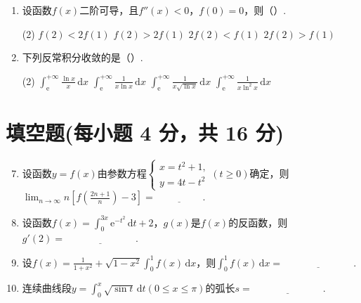 \documentclass[../main.tex]{subfiles}
\begin{document}
\begin{enumerate}
    \item 设函数$f(x)$二阶可导，且$f''(x)<0$，$f(0)=0$，则（\qquad）.

          \begin{tasks}[label=\textbf{\Alph*.}, label-width=1.5em, column-sep=1em](2)
              \task $f(2)<2f(1)$
              \task $f(2)>2f(1)$
              \task $2f(2)<f(1)$
              \task $2f(2)>f(1)$
          \end{tasks}

    \item 下列反常积分收敛的是（\qquad）.

          \begin{tasks}[label=\textbf{\Alph*.}, label-width=1.5em, column-sep=1em](2)
              \task $\int_{\mathrm{e}}^{+\infty}\frac{\ln x}{x}\,\mathrm{d}x$
              \task $\int_{\mathrm{e}}^{+\infty}\frac{1}{x\ln x}\,\mathrm{d}x$
              \task $\int_{\mathrm{e}}^{+\infty}\frac{1}{x\sqrt{\ln x}}\,\mathrm{d}x$
              \task $\int_{\mathrm{e}}^{+\infty}\frac{1}{x\ln^{2}x}\,\mathrm{d}x$
          \end{tasks}
\end{enumerate}

\section{填空题(每小题 4 分，共 16 分)}
\begin{enumerate}
    \setcounter{enumi}{6}
    \item 设函数$y=f(x)$由参数方程$\begin{cases}
                  x=t^{2}+1, \\
                  y=4t-t^{2}
              \end{cases}(t\geq0)$确定，则$\lim_{n\to\infty}n\left[f\left(\frac{2n+1}{n}\right
                  )-3\right]=\underline{\hspace{2cm}}$.

    \item 设函数$f(x)=\int_{0}^{3x}\mathrm{e}^{-t^2}\,\mathrm{d}t+2$，$g(x)$是$f
              (x)$的反函数，则$g'(2)=\underline{\hspace{3cm}}$.

    \item 设$f(x)=\frac{1}{1+x^{2}}+\sqrt{1-x^{2}}\int_{0}^{1} f(x)\,\mathrm{d}
              x$，则$\int_{0}^{1} f(x)\,\mathrm{d}x=\underline{\hspace{3cm}}$.

    \item 连续曲线段$y=\int_{0}^{x}\sqrt{\sin t}\,\mathrm{d}t(0\leq x\leq \pi)$的弧长$s
              =\underline{\hspace{3cm}}$.
\end{enumerate}
\end{document}
